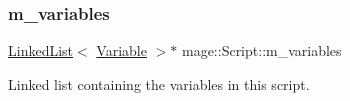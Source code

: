 \subsubsection{\texorpdfstring{m\+\_\+variables}{m\_variables}}
{\footnotesize\ttfamily \hyperlink{classmage_1_1_linked_list}{Linked\+List}$<$ \hyperlink{structmage_1_1_variable}{Variable} $>$$\ast$ mage\+::\+Script\+::m\+\_\+variables\hspace{0.3cm}{\ttfamily [private]}}

Linked list containing the variables in this script. 